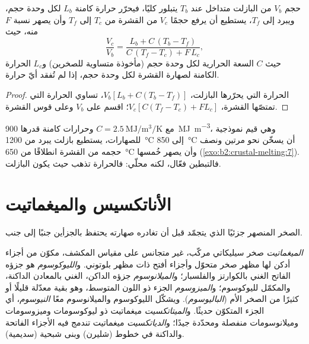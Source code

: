 \begin{proposition}\label{prop:b2:crustal-melting:heat}
حجم $V_b$ من البازلت متداخل عند $T_b$ يتبلور كليًا، فيحرّر
حرارة كامنة $L_b$ لكل وحدة حجم، ويبرد إلى $T_f$، يستطيع أن يرفع حجمًا $V_c$ من القشرة
من $T_c$ إلى $T_f$ وأن يصهر نسبة $F$ منه، حيث
\[\frac{V_c}{V_b} = \frac{L_b + C\,(T_b - T_f)}{C\,(T_f - T_c) + F\,L_c},\]
حيث $C$ السعة الحرارية لكل وحدة حجم (مأخوذة متساوية للصخرين) و$L_c$
الحرارة الكامنة لصهارة القشرة لكل وحدة حجم، إذا لم تُفقد أيّ حرارة.
\end{proposition}

\begin{proof}
الحرارة التي يحرّرها البازلت، $V_b[L_b + C(T_b - T_f)]$، تساوي الحرارة التي تمتصّها
القشرة، $V_c[C(T_f - T_c) + F L_c]$؛ اقسم على $V_b$ وعلى قوس القشرة.
\end{proof}

مع $C = \qty{2.5}{\mega\joule\per\cubic\metre\per\kelvin}$ وحرارات كامنة قدرها
\qty{900}{\mega\joule\per\cubic\metre}، وهي قيم نموذجية للصهارات، يستطيع بازلت يبرد من
\qty{1200}{\celsius} إلى \qty{850}{\celsius} أن يسخّن نحو مرتين ونصف حجمه
من القشرة انطلاقًا من \qty{650}{\celsius} وأن يصهر خُمسها (\cref{exo:b2:crustal-melting:7}).
فالتبطين فعّال، لكنه محلّي: فالحرارة تذهب حيث يكون البازلت.

\section{الأناتكسيس والميغماتيت}\label{sec:b2:crustal-melting:migmatites}

الصخر المنصهر جزئيًا الذي يتجمّد قبل أن تغادره صهارته يحتفظ بالجزأين جنبًا إلى جنب.

\begin{definition}\label{def:b2:crustal-melting:migmatite}
\emph{الميغماتيت} صخر سيليكاتي مركّب، غير متجانس على
مقياس المكشف، مكوّن من أجزاء أدكن لها مظهر صخر متحوّل وأجزاء أفتح
ذات مظهر بلوتوني. و\emph{الليوكوسوم} هو جزؤه الفاتح الغني بالكوارتز
والفلسبار؛ و\emph{الميلانوسوم} جزؤه الداكن، الغني بالمعادن
الداكنة، والمكمّل لليوكوسوم؛ و\emph{الميزوسوم} الجزء ذو اللون
المتوسط، وهو بقية معدّلة قليلًا أو كثيرًا من الصخر الأم (\emph{الباليوسوم}).
ويشكّل الليوكوسوم والميلانوسوم معًا \emph{النيوسوم}، أي الجزء المتكوّن حديثًا.
و\emph{الميتاتكسيت} ميغماتيت ذو ليوكوسومات وميزوسومات وميلانوسومات منفصلة
ومحدّدة جيدًا؛ و\emph{الدياتكسيت} ميغماتيت تندمج فيه الأجزاء الفاتحة
والداكنة في خطوط (شليرن) وبنى شبحية (سديمية).
\end{definition}

